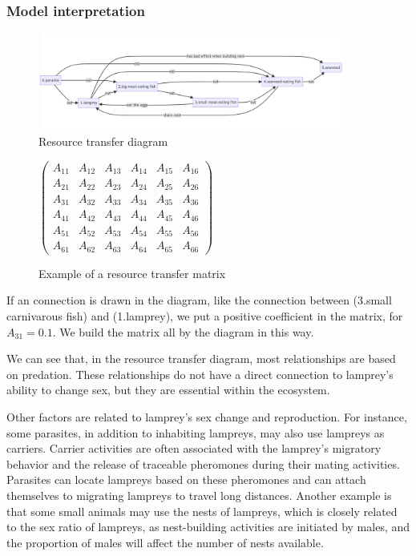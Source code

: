 \documentclass[12pt]{article}
\begin{document}
\subsubsection{Model interpretation}
\begin{figure}[h]
	\centering
	\includegraphics[width=0.9\textwidth]{Q4_EnvStructure.png}
	\caption{Resource transfer diagram}
\end{figure}
\begin{figure}[h]
	\centering
	$\begin{pmatrix}
			A_{11} & A_{12} & A_{13} & A_{14} & A_{15} & A_{16} \\
			A_{21} & A_{22} & A_{23} & A_{24} & A_{25} & A_{26} \\
			A_{31} & A_{32} & A_{33} & A_{34} & A_{35} & A_{36} \\
			A_{41} & A_{42} & A_{43} & A_{44} & A_{45} & A_{46} \\
			A_{51} & A_{52} & A_{53} & A_{54} & A_{55} & A_{56} \\
			A_{61} & A_{62} & A_{63} & A_{64} & A_{65} & A_{66}
		\end{pmatrix}$
	\caption*{Example of a resource transfer matrix}
\end{figure}

If an connection is drawn in the diagram, like the connection between (3.small carnivarous
fish) and (1.lamprey), we put a positive coefficient in the matrix, for $A_{31} = 0.1$.
We build the matrix all by the diagram in this way.

We can see that, in the resource transfer diagram, most relationships are based on predation.
These relationships do not have a direct connection to lamprey's ability to change sex, but
they are essential within the ecosystem.

Other factors are related to lamprey's sex change and reproduction. For instance, some parasites,
in addition to inhabiting lampreys, may also use lampreys as carriers. Carrier activities are
often associated with the lamprey's migratory behavior and the release of traceable pheromones
during their mating activities. Parasites can locate lampreys based on these pheromones and
can attach themselves to migrating lampreys to travel long distances. Another example is that
some small animals may use the nests of lampreys, which is closely related to the sex ratio of
lampreys, as nest-building activities are initiated by males, and the proportion of males will
affect the number of nests available.
\end{document}
